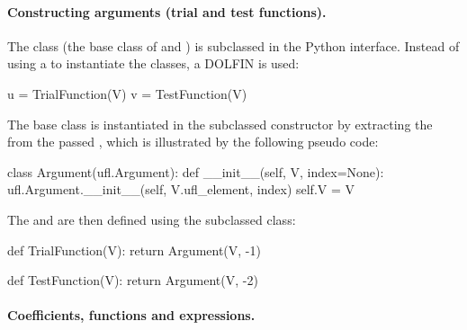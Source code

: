 \paragraph{Constructing arguments (trial and test functions).}

The  class (the base class of\break {}
and ) is subclassed in the Python interface. Instead
of using a  to instantiate the classes, a DOLFIN
 is used:
\begin{python}
u = TrialFunction(V)
v = TestFunction(V)
\end{python}
The  base class is instantiated in the subclassed
constructor by extracting the\break {} from the passed
, which is illustrated by the following pseudo
code:
\begin{python}
class Argument(ufl.Argument):
    def __init__(self, V, index=None):
        ufl.Argument.__init__(self, V.ufl_element, index)
        self.V = V
\end{python}
The  and  are then defined using the
subclassed  class:
\begin{python}
def TrialFunction(V):
    return Argument(V, -1)

def TestFunction(V):
    return Argument(V, -2)
\end{python}

\enlargethispage{12pt}

\paragraph{Coefficients, functions and expressions.}

